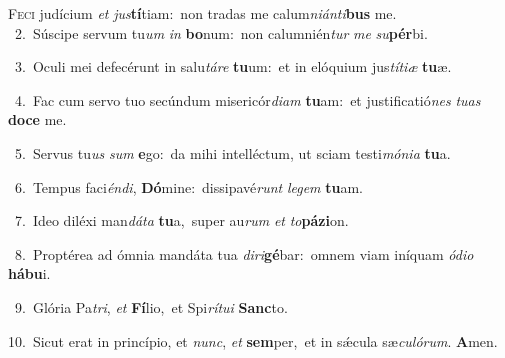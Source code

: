 \lettrine{\initial\textcolor{\initialcolor}{F}}{eci} judícium \textit{et} \textit{jus}\-\textbf{tí}tiam:~\star non tradas me calum\-\textit{ni}\-\textit{án}\textit{ti}\textbf{bus} me.\\
{\numbfont\textcolor{\numbcolor}{~2.}}~Súscipe servum tu\textit{um} \textit{in} \textbf{bo}\-num:~\star non calumnién\textit{tur} \textit{me} \textit{su}\-\textbf{pér}bi.\par
{\numbfont\textcolor{\numbcolor}{~3.}}~Oculi mei defecérunt in salu\-\textit{tá}\-\textit{re} \textbf{tu}\-um:~\star et in elóquium jus\-\textit{tí}\-\textit{ti}\textit{æ} \textbf{tu}\-æ.\par
{\numbfont\textcolor{\numbcolor}{~4.}}~Fac cum servo tuo secúndum misericór\-\textit{di}\-\textit{am} \textbf{tu}\-am:~\star et justificatió\textit{nes} \textit{tu}\-\textit{as} \textbf{do}\-\textbf{ce} me.\par
{\numbfont\textcolor{\numbcolor}{~5.}}~Servus tu\textit{us} \textit{sum} \textbf{e}\-go:~\star da mihi intelléctum, ut sciam testi\-\textit{mó}\-\textit{ni}\textit{a} \textbf{tu}\-a.\par
{\numbfont\textcolor{\numbcolor}{~6.}}~Tempus faci\-\textit{én}\-\textit{di}, \textbf{Dó}\-mine:~\star dissipavé\textit{runt} \textit{le}\-\textit{gem} \textbf{tu}\-am.\par
{\numbfont\textcolor{\numbcolor}{~7.}}~Ideo diléxi man\-\textit{dá}\-\textit{ta} \textbf{tu}\-a,~\star super au\textit{rum} \textit{et} \textit{to}\-\textbf{pá}\textbf{zi}on.\par
{\numbfont\textcolor{\numbcolor}{~8.}}~Proptérea ad ómnia mandáta tua \textit{di}\-\textit{ri}\textbf{gé}bar:~\star omnem viam iníquam \textit{ó}\-\textit{di}\textit{o} \textbf{há}\-\textbf{bu}i.\par
{\numbfont\textcolor{\numbcolor}{~9.}}~Glória Pa\-\textit{tri}\-, \textit{et} \textbf{Fí}\-lio,~\star et Spi\-\textit{rí}\-\textit{tu}\textit{i} \textbf{Sanc}\-to.\par
{\numbfont\textcolor{\numbcolor}{10.}}~Sicut erat in princípio, et \textit{nunc}\-, \textit{et} \textbf{sem}\-per,~\star et in sǽcula sæ\-\textit{cu}\-\textit{ló}\textit{rum}. \textbf{A}\-men.\par
